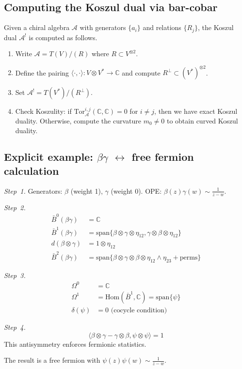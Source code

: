 \subsection{Computing the Koszul dual via bar-cobar}

\begin{remark}[Procedure]\label{rem:koszul-dual-procedure}
Given a chiral algebra $\mathcal{A}$ with generators $\{a_i\}$ and relations $\{R_j\}$, the Koszul dual $\mathcal{A}^!$ is computed as follows.
\begin{enumerate}
\item Write $\mathcal{A} = T(V)/(R)$ where $R \subset V^{\otimes 2}$.
\item Define the pairing $\langle \cdot, \cdot \rangle\colon V \otimes V^* \to \mathbb{C}$ and compute $R^\perp \subset (V^*)^{\otimes 2}$.
\item Set $\mathcal{A}^! = T(V^*)/(R^\perp)$.
\item Check Koszulity: if $\mathrm{Tor}_{\mathcal{A}}^{i,j}(\mathbb{C}, \mathbb{C}) = 0$ for $i \neq j$, then we have exact Koszul duality. Otherwise, compute the curvature $m_0 \neq 0$ to obtain curved Koszul duality.
\end{enumerate}
\end{remark}

\subsection{\texorpdfstring{Explicit example: $\beta\gamma$ $\leftrightarrow$ free fermion calculation}{Explicit example: free fermion calculation}}

\begin{calculation}
\emph{Step~1.}
Generators: $\beta$ (weight 1), $\gamma$ (weight 0).
OPE: $\beta(z)\gamma(w) \sim \frac{1}{z-w}$.

\emph{Step~2.}
\begin{align}
\bar{B}^0(\beta\gamma) &= \mathbb{C} \\
\bar{B}^1(\beta\gamma) &= \text{span}\{\beta \otimes \gamma \otimes \eta_{12}, \gamma \otimes \beta \otimes \eta_{12}\} \\
d(\beta \otimes \gamma) &= 1 \otimes \eta_{12} \\
\bar{B}^2(\beta\gamma) &= \text{span}\{\beta \otimes \gamma \otimes \beta \otimes \eta_{12} \wedge \eta_{23} + \text{perms}\}
\end{align}

\emph{Step~3.}
\begin{align}
\Omega^0 &= \mathbb{C} \\
\Omega^1 &= \text{Hom}(\bar{B}^1, \mathbb{C}) = \text{span}\{\psi\} \\
\delta(\psi) &= 0 \text{ (cocycle condition)}
\end{align}

\emph{Step~4.}
\[\langle \beta \otimes \gamma - \gamma \otimes \beta, \psi \otimes \psi \rangle = 1\]
This antisymmetry enforces fermionic statistics.

The result is a free fermion with $\psi(z)\psi(w) \sim \frac{1}{z-w}$.
\end{calculation}

